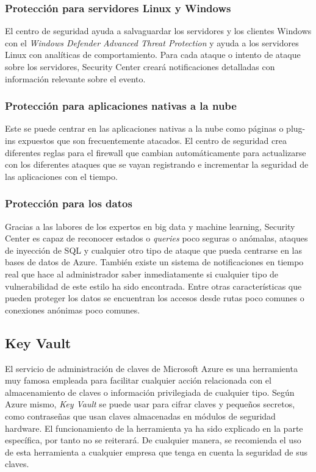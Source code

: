 \documentclass[english,runningheads,a4paper]{llncs}[2018/03/10]
\begin{document}
\subsubsection*{Protección para servidores Linux y Windows}
El centro de seguridad ayuda a salvaguardar los servidores y los clientes
Windows con el \textit{Windows Defender Advanced Threat Protection} y ayuda a
los servidores Linux con analíticas de comportamiento. Para cada ataque o
intento de ataque sobre los servidores, Security Center creará notificaciones
detalladas con información relevante sobre el evento.

\subsubsection*{Protección para aplicaciones nativas a la nube}
Este se puede centrar en las aplicaciones nativas a la nube como páginas o
plug-ins expuestos que son frecuentemente atacados. El centro de seguridad crea
diferentes reglas para el firewall que cambian automáticamente para actualizarse
con los diferentes ataques que se vayan registrando e incrementar la seguridad
de las aplicaciones con el tiempo.

\subsubsection*{Protección para los datos}
Gracias a las labores de los expertos en big data y machine learning, Security
Center es capaz de reconocer estados o \textit{queries} poco seguras o anómalas,
ataques de inyección de SQL y cualquier otro tipo de ataque que pueda centrarse
en las bases de datos de Azure. También existe un sistema de notificaciones en
tiempo real que hace al administrador saber inmediatamente si cualquier tipo de
vulnerabilidad de este estilo ha sido encontrada. Entre otras características
que pueden proteger los datos se encuentran los accesos desde rutas poco comunes
o conexiones anónimas poco comunes.

\subsection*{Key Vault}

El servicio de administración de claves de Microsoft Azure es una herramienta
muy famosa empleada para facilitar cualquier acción relacionada con el
almacenamiento de claves o información privilegiada de cualquier tipo. Según
Azure mismo, \textit{Key Vault} se puede usar para cifrar claves y pequeños
secretos, como contraseñas que usan claves almacenadas en módulos de seguridad
hardware. El funcionamiento de la herramienta ya ha sido explicado en la parte
específica, por tanto no se reiterará. De cualquier manera, se recomienda el uso
de esta herramienta a cualquier empresa que tenga en cuenta la seguridad de sus
claves.
\end{document}
